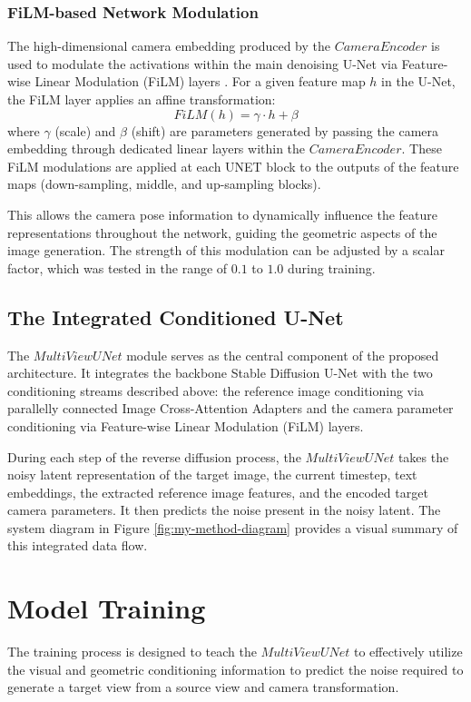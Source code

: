 \subsubsection{FiLM-based Network Modulation}
The high-dimensional camera embedding produced by the $CameraEncoder$ is used to modulate the activations within the main denoising U-Net via Feature-wise Linear Modulation (FiLM) layers \cite{film}. For a given feature map $h$ in the U-Net, the FiLM layer applies an affine transformation:
\[ FiLM(h) = \gamma \cdot h + \beta \]
where $\gamma$ (scale) and $\beta$ (shift) are parameters generated by passing the camera embedding through dedicated linear layers within the $CameraEncoder$.
These FiLM modulations are applied at each UNET block to the outputs of the feature maps (down-sampling, middle, and up-sampling blocks).

This allows the camera pose information to dynamically influence the feature representations throughout the network, guiding the geometric aspects of the image generation. The strength of this modulation can be adjusted by a scalar factor, which was tested in the range of $0.1$ to $1.0$ during training.

\subsection{The Integrated Conditioned U-Net}
The $MultiViewUNet$ module serves as the central component of the proposed architecture. It integrates the backbone Stable Diffusion U-Net with the two conditioning streams described above: the reference image conditioning via parallelly connected Image Cross-Attention Adapters and the camera parameter conditioning via Feature-wise Linear Modulation (FiLM) layers.

During each step of the reverse diffusion process, the $MultiViewUNet$ takes the noisy latent representation of the target image, the current timestep, text embeddings, the extracted reference image features, and the encoded target camera parameters. It then predicts the noise present in the noisy latent. The system diagram in Figure \ref{fig:my-method-diagram} provides a visual summary of this integrated data flow.

\section{Model Training}
The training process is designed to teach the $MultiViewUNet$ to effectively utilize the visual and geometric conditioning information to predict the noise required to generate a target view from a source view and camera transformation.

